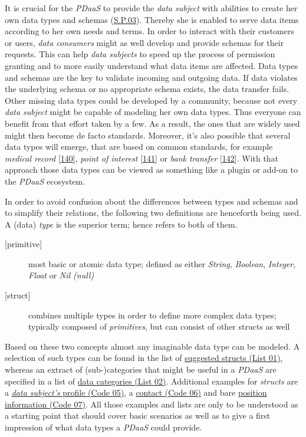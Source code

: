 \documentclass[12pt,english,a4paper,titlepage,cleardoublepage=empty,dottedtoc]{report}
\begin{document}
It is crucial for the \emph{PDaaS} to provide the \emph{data subject}
with abilities to create her own data types and schemas
(\protect\hyperlink{sp03}{S.P.03}). Thereby she is enabled to serve data
items according to her own needs and terms. In order to interact with
their customers or users, \emph{data consumers} might as well develop
and provide schemas for their requests. This can help \emph{data
subjects} to speed up the process of permission granting and to more
easily understand what data items are affected. Data types and schemas
are the key to validate incoming and outgoing data. If data violates the
underlying schema or no appropriate schema exists, the data transfer
fails. Other missing data types could be developed by a community,
because not every \emph{data subject} might be capable of modeling her
own data types. Thus everyone can benefit from that effort taken by a
few. As a result, the ones that are widely used might then become de
facto standards. Moreover, it's also possible that several data types
will emerge, that are based on common standards, for example
\emph{medical record}
{[}\protect\hyperlink{ref-web_spec_data-schemas_ehr}{140}{]},
\emph{point of interest}
{[}\protect\hyperlink{ref-web_spec_data-schemas_poi}{141}{]} or
\emph{bank transfer}
{[}\protect\hyperlink{ref-web_spec_data-schemas_bank-transfer}{142}{]}.
With that approach those data types can be viewed as something like a
plugin or add-on to the \emph{PDaaS} ecosystem.

In order to avoid confusion about the differences between types and
schemas and to simplify their relations, the following two definitions
are henceforth being used. A (data) \emph{type} is the superior term;
hence refers to both of them.

\begin{description}
\item[{[}primitive{]}]
most basic or atomic data type; defined as either \emph{String},
\emph{Boolean}, \emph{Integer}, \emph{Float} or \emph{Nil (null)}
\item[{[}struct{]}]
combines multiple types in order to define more complex data types;
typically composed of \emph{primitives}, but can consist of other
structs as well
\end{description}

Based on these two concepts almost any imaginable data type can be
modeled. A selection of such types can be found in the list of
\protect\hyperlink{list-01_suggested-structs}{suggested structs (List
01)}, whereas an extract of (sub-)categories that might be useful in a
\emph{PDaaS} are specified in a list of
\protect\hyperlink{list-02_data-categories}{data categories (List 02)}.
Additional examples for \emph{structs} are a
\protect\hyperlink{code-05_struct_profile}{\emph{data subject's} profile
(Code 05)}, a \protect\hyperlink{code-06_struct_contact}{contact (Code
06)} and bare \protect\hyperlink{code-07_struct_position}{position
information (Code 07)}. All those examples and lists are only to be
understood as a starting point that should cover basic scenarios as well
as to give a first impression of what data types a \emph{PDaaS} could
provide.
\end{document}
